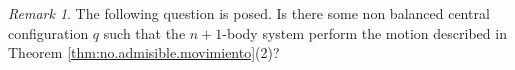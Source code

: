 \documentclass[twoside]{article}
\theoremstyle{remark}
\newtheorem{comentario}{Remark}
\begin{document}
\begin{comentario}
 The following question is posed. Is there some non balanced central configuration $q$ such that the $n+1$-body system perform the motion described in Theorem \ref{thm:no.admisible.movimiento}(2)?
\end{comentario}





 
\end{document}
